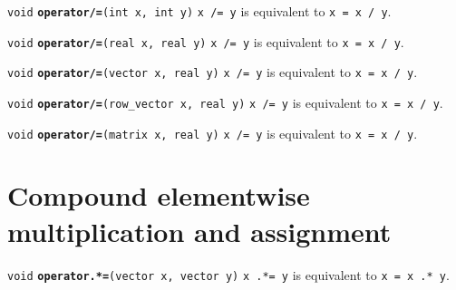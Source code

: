 \documentclass[
  10pt,
]{book}
\begin{document}

\texttt{void} \textbf{\texttt{operator/=}}\texttt{(int\ x,\ int\ y)}\newline
\texttt{x\ /=\ y} is equivalent to \texttt{x\ =\ x\ /\ y}.


\texttt{void} \textbf{\texttt{operator/=}}\texttt{(real\ x,\ real\ y)}\newline
\texttt{x\ /=\ y} is equivalent to \texttt{x\ =\ x\ /\ y}.


\texttt{void} \textbf{\texttt{operator/=}}\texttt{(vector\ x,\ real\ y)}\newline
\texttt{x\ /=\ y} is equivalent to \texttt{x\ =\ x\ /\ y}.


\texttt{void} \textbf{\texttt{operator/=}}\texttt{(row\_vector\ x,\ real\ y)}\newline
\texttt{x\ /=\ y} is equivalent to \texttt{x\ =\ x\ /\ y}.


\texttt{void} \textbf{\texttt{operator/=}}\texttt{(matrix\ x,\ real\ y)}\newline
\texttt{x\ /=\ y} is equivalent to \texttt{x\ =\ x\ /\ y}.

\hypertarget{compound-elementwise-multiplication-and-assignment}{%
\section{Compound elementwise multiplication and assignment}\label{compound-elementwise-multiplication-and-assignment}}


\texttt{void} \textbf{\texttt{operator.*=}}\texttt{(vector\ x,\ vector\ y)}\newline
\texttt{x\ .*=\ y} is equivalent to \texttt{x\ =\ x\ .*\ y}.

\end{document}
